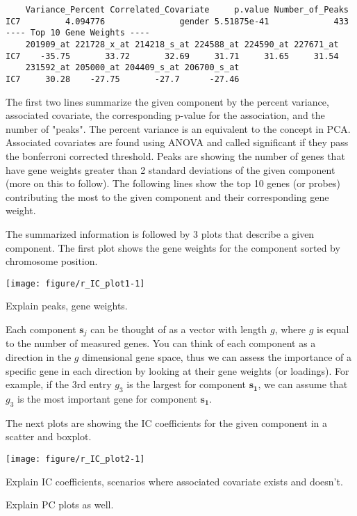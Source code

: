 \documentclass[11pt, oneside]{article}\usepackage[]{graphicx}\usepackage[]{color}
\makeatletter
\def\maxwidth{ %
  \ifdim\Gin@nat@width>\linewidth
    \linewidth
  \else
    \Gin@nat@width
  \fi
}
\newenvironment{kframe}{%
 \def\at@end@of@kframe{}%
 \ifinner\ifhmode%
  \def\at@end@of@kframe{\end{minipage}}%
  \begin{minipage}{\columnwidth}%
 \fi\fi%
 \def\FrameCommand##1{\hskip\@totalleftmargin \hskip-\fboxsep
 \colorbox{shadecolor}{##1}\hskip-\fboxsep
     \hskip-\linewidth \hskip-\@totalleftmargin \hskip\columnwidth}%
 \MakeFramed {\advance\hsize-\width
   \@totalleftmargin\z@ \linewidth\hsize
   \@setminipage}}%
 {\par\unskip\endMakeFramed%
 \at@end@of@kframe}
\newenvironment{knitrout}{}{} %
\makeatother
\begin{document}
\begin{knitrout}
\color{fgcolor}\begin{kframe}
\begin{verbatim}
    Variance_Percent Correlated_Covariate     p.value Number_of_Peaks
IC7         4.094776               gender 5.51875e-41             433
---- Top 10 Gene Weights ---- 
    201909_at 221728_x_at 214218_s_at 224588_at 224590_at 227671_at
IC7    -35.75       33.72       32.69     31.71     31.65     31.54
    231592_at 205000_at 204409_s_at 206700_s_at
IC7     30.28    -27.75       -27.7      -27.46
\end{verbatim}
\end{kframe}
\end{knitrout}

The first two lines summarize the given component by the percent variance, associated covariate, the corresponding p-value for the association, and the number of "peaks". The percent variance is an equivalent to the concept in PCA. Associated covariates are found using ANOVA and called significant if they pass the bonferroni corrected threshold. Peaks are showing the number of genes that have gene weights greater than 2 standard deviations of the given component (more on this to follow). The following lines show the top 10 genes (or probes) contributing the most to the given component and their corresponding gene weight. 

The summarized information is followed by 3 plots that describe a given component. The first plot shows the gene weights for the component sorted by chromosome position.

\begin{knitrout}
\color{fgcolor}
\texttt{[image: figure/r\_IC\_plot1-1]} 

\end{knitrout}

Explain peaks, gene weights. 

Each component $\mathbf{s}_j$ can be thought of as a vector with length $g$, where $g$ is equal to the number of measured genes. You can think of each component as a direction in the $g$ dimensional gene space, thus we can assess the importance of a specific gene in each direction by looking at their gene weights (or loadings). For example, if the 3rd entry $g_3$ is the largest for component $\mathbf{s_1}$, we can assume that $g_3$ is the most important gene for component $\mathbf{s_1}$.


The next plots are showing the IC coefficients for the given component in a scatter and boxplot. 

\begin{knitrout}
\color{fgcolor}
\texttt{[image: figure/r\_IC\_plot2-1]} 

\end{knitrout}

Explain IC coefficients, scenarios where associated covariate exists and doesn't.


Explain PC plots as well. 
\end{document}
